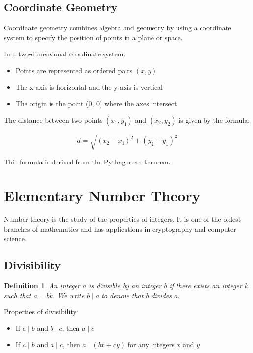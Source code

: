 \documentclass[12pt,a4paper]{article}
\newtheorem{definition}{Definition}
\begin{document}
\subsection{Coordinate Geometry}

Coordinate geometry combines algebra and geometry by using a coordinate system to specify the position of points in a plane or space.

In a two-dimensional coordinate system:
\begin{itemize}
    \item Points are represented as ordered pairs $(x, y)$
    \item The x-axis is horizontal and the y-axis is vertical
    \item The origin is the point (0, 0) where the axes intersect
\end{itemize}

The distance between two points $(x_1, y_1)$ and $(x_2, y_2)$ is given by the formula:

\[ d = \sqrt{(x_2 - x_1)^2 + (y_2 - y_1)^2} \]

This formula is derived from the Pythagorean theorem.

\section{Elementary Number Theory}

Number theory is the study of the properties of integers. It is one of the oldest branches of mathematics and has applications in cryptography and computer science.

\subsection{Divisibility}

\begin{definition}
An integer $a$ is divisible by an integer $b$ if there exists an integer $k$ such that $a = bk$. We write $b \mid a$ to denote that $b$ divides $a$.
\end{definition}

Properties of divisibility:
\begin{itemize}
    \item If $a \mid b$ and $b \mid c$, then $a \mid c$
    \item If $a \mid b$ and $a \mid c$, then $a \mid (bx + cy)$ for any integers $x$ and $y$
\end{itemize}
\end{document}

